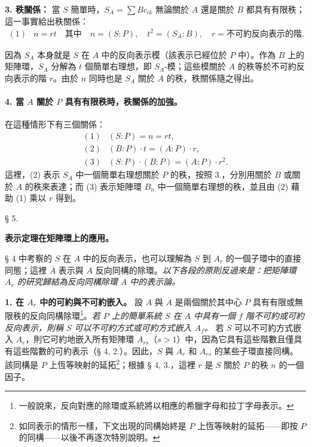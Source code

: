 \documentclass[11pt]{article}
\begin{document}
\noindent\textbf{3. 秩關係：} 當 \(S\) 簡單時，\(S_A=\sum Bc_{ik}\) 無論關於 \(A\) 還是關於 \(B\) 都具有有限秩；這一事實給出秩關係：
\[
\begin{array}{rl}
(1)& n=rt\quad\text{其中}\quad n=(S:P),\quad t^2=(S_A:B),\quad r=\text{不可約反向表示的階}.
\end{array}
\]

因為 \(S_A\) 本身就是 \(S\) 在 \(A\) 中的反向表示模（該表示已經位於 \(P\) 中）。作為 \(B\) 上的矩陣環，\(S_A\) 分解為 \(t\) 個簡單右理想，即 \(S_A\)-模；這些模關於 \(A\) 的秩等於不可約反向表示的階 \(r\)。由於 \(n\) 同時也是 \(S_A\) 關於 \(A\) 的秩，秩關係隨之得出。

\paragraph{4. 當 \(A\) 關於 \(P\) 具有有限秩時，秩關係的加強。}
在這種情形下有三個關係：
\[
\begin{array}{rl}
(1)& (S:P)=n=rt,\\
(2)& (B:P)\cdot t=(A:P)\cdot r,\\
(3)& (S:P)\cdot(B:P)=(A:P)\cdot r^2.
\end{array}
\]
這裡，(2) 表示 \(S_A\) 中一個簡單右理想關於 \(P\) 的秩，按照 3.，分別用關於 \(B\) 或關於 \(A\) 的秩來表達；而 (3) 表示矩陣環 \(B_n\) 中一個簡單右理想的秩，並且由 (2) 藉助 (1) 乘以 \(r\) 得到。

\begin{center}
§ 5.

\textbf{表示定理在矩陣環上的應用。}
\end{center}

§ 4 中考察的 \(S\) 在 \(A\) 中的反向表示，也可以理解為 \(S\) 到 \(A_r\) 的一個子環中的直接同態；這裡 \(\overline A\) 表示與 \(A\) 反向同構的除環。\emph{以下各段的原則反過來是：把矩陣環 \(A_r\) 的研究歸結為反向同構除環 \(A\) 中的表示論。}

\noindent\textbf{1. 在 \(A_r\) 中的可約與不可約嵌入。} 設 \(A\) 與 \(\overline A\) 是兩個關於其中心 \(P\) 具有有限或無限秩的反向同構除環\footnote{一般說來，反向對應的除環或系統將以相應的希臘字母和拉丁字母表示。}。\emph{若 \(P\) 上的簡單系統 \(S\) 在 \(A\) 中具有一個 \(f\) 階不可約或可約反向表示，則稱 \(S\) 可以不可約方式或可約方式嵌入 \(A_f\)。} 若 \(S\) 可以不可約方式嵌入 \(A_r\)，則它可約地嵌入所有矩陣環 \(A_{rs}\)（\(s>1\)）中，因為它具有這些階數且僅具有這些階數的可約表示（§ 4, 2.）。因此，\(S\) 與 \(A_r\) 和 \(A_{rs}\) 的某些子環直接同構。該同構是 \(P\) 上恆等映射的延拓\footnote{如同表示的情形一樣，下文出現的同構始終是 \(P\) 上恆等映射的延拓——即按 \(P\) 的同構——以後不再逐次特別說明。}；根據 § 4, 3.，這裡 \(r\) 是 \(S\) 關於 \(P\) 的秩 \(n\) 的一個因子。
\end{document}
